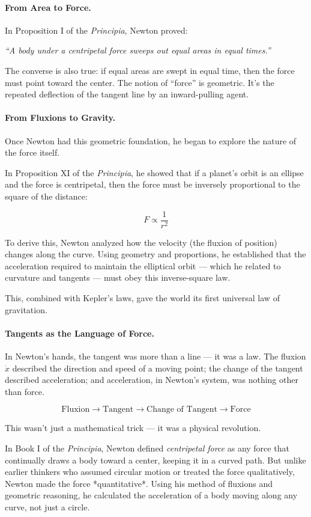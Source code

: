 \paragraph{From Area to Force.} In Proposition I of the \textit{Principia}, Newton proved:  

\textit{“A body under a centripetal force sweeps out equal areas in equal times.”}

The converse is also true: if equal areas are swept in equal time, then the force must point toward the center. The notion of “force” is geometric. It’s the repeated deflection of the tangent line by an inward-pulling agent.

\paragraph{From Fluxions to Gravity.} Once Newton had this geometric foundation, he began to explore the nature of the force itself.

In Proposition XI of the \textit{Principia}, he showed that if a planet’s orbit is an ellipse and the force is centripetal, then the force must be inversely proportional to the square of the distance:

\[
F \propto \frac{1}{r^2}
\]

To derive this, Newton analyzed how the velocity (the fluxion of position) changes along the curve. Using geometry and proportions, he established that the acceleration required to maintain the elliptical orbit — which he related to curvature and tangents — must obey this inverse-square law.

This, combined with Kepler’s laws, gave the world its first universal law of gravitation.

\paragraph{Tangents as the Language of Force.} In Newton’s hands, the tangent was more than a line — it was a law. The fluxion $\dot{x}$ described the direction and speed of a moving point; the change of the tangent described acceleration; and acceleration, in Newton’s system, was nothing other than force.

\[
\text{Fluxion} \rightarrow \text{Tangent} \rightarrow \text{Change of Tangent} \rightarrow \text{Force}
\]

This wasn’t just a mathematical trick — it was a physical revolution.

In Book I of the \textit{Principia}, Newton defined \textit{centripetal force} as any force that continually draws a body toward a center, keeping it in a curved path. But unlike earlier thinkers who assumed circular motion or treated the force qualitatively, Newton made the force *quantitative*. Using his method of fluxions and geometric reasoning, he calculated the acceleration of a body moving along any curve, not just a circle.

